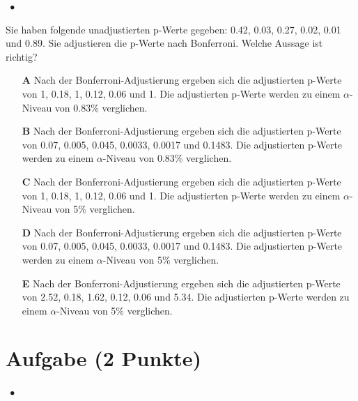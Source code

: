 \documentclass[a4paper, 9pt]{scrartcl}\usepackage[]{graphicx}\usepackage[]{xcolor}
\begin{document}
\ifcollection
\begin{flushright}
\tiny\vspace{-2Ex}
\textbf{\examinhaltstart}
\exammodulestatversuch $\;\bullet$
\exammodulebiostat
\vspace{-1Ex}
\end{flushright}
\fi




Sie haben folgende unadjustierten p-Werte gegeben: 0.42, 0.03, 0.27, 0.02, 0.01 und 0.89. Sie adjustieren die p-Werte nach
Bonferroni. Welche Aussage ist richtig?



\begin{enumerate}
\item [\textbf{A} \msquare] Nach der Bonferroni-Adjustierung ergeben sich die adjustierten p-Werte von 1, 0.18, 1, 0.12, 0.06 und 1. Die adjustierten p-Werte werden zu einem $\alpha$-Niveau von 0.83\% verglichen.
\item [\textbf{B} \msquare] Nach der Bonferroni-Adjustierung ergeben sich die adjustierten p-Werte von 0.07, 0.005, 0.045, 0.0033, 0.0017 und 0.1483. Die adjustierten p-Werte werden zu einem $\alpha$-Niveau von 0.83\% verglichen.
\item [\textbf{C} \msquare] Nach der Bonferroni-Adjustierung ergeben sich die adjustierten p-Werte von 1, 0.18, 1, 0.12, 0.06 und 1. Die adjustierten p-Werte werden zu einem $\alpha$-Niveau von 5\% verglichen.
\item [\textbf{D} \msquare] Nach der Bonferroni-Adjustierung ergeben sich die adjustierten p-Werte von 0.07, 0.005, 0.045, 0.0033, 0.0017 und 0.1483. Die adjustierten p-Werte werden zu einem $\alpha$-Niveau von 5\% verglichen.
\item [\textbf{E} \msquare] Nach der Bonferroni-Adjustierung ergeben sich die adjustierten p-Werte von 2.52, 0.18, 1.62, 0.12, 0.06 und 5.34. Die adjustierten p-Werte werden zu einem $\alpha$-Niveau von 5\% verglichen.
\end{enumerate}

\section{Aufgabe \hfill (2 Punkte)}

\ifcollection
\begin{flushright}
\tiny\vspace{-2Ex}
\textbf{\examinhaltstart}
\exammodulestatversuch $\;\bullet$
\exammodulebiostat
\vspace{-1Ex}
\end{flushright}
\fi
\end{document}
